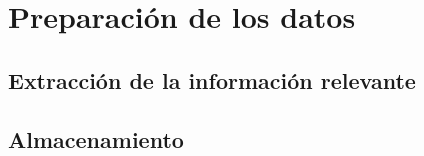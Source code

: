 \chapter{Preparaci\'on de los datos}
\section{Extracci\'on de la informaci\'on relevante}
\section{Almacenamiento}